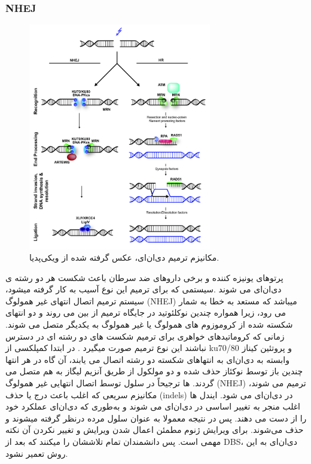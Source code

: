 \documentclass[12pt,a4paper,BCOR=.7cm,headsepline,bibliography=totoc]{report}
\begin{document}
\subsubsection{NHEJ}
\begin{figure}
\centering
\vspace{-65pt}
\includegraphics[width=8cm, ]{pictures/DBSrepair.jpg}
\vspace{-15pt}
\caption{
مکانیزم ترمیم دی‌ان‌ای، عکس گرفته شده از ویکی‌پدیا.
}\label{wrap-fig:4}
\end{figure}
پرتوهای یونیزه کننده و برخی داروهای ضد سرطان باعث شکست هر دو رشته ی دی‌ان‌ای می شوند .سیستمی که برای ترمیم این نوع آسیب به کار گرفته میشود، سیستم ترمیم اتصال انتهای غیر همولوگ (NHEJ) میباشد که مستعد به خطا به شمار می رود، زیرا همواره چندین نوکلئوتید در جایگاه ترمیم از بین می روند و دو انتهای شکسته شده از کروموزوم های همولوگ یا غیر همولوگ به یکدیگر متصل می شوند.
زمانی که کروماتیدهای خواهری برای ترمیم شکست های دو رشته ای در دسترس نباشند این نوع ترمیم صورت میگیرد . در ابتدا کمپلکسی از ku70/80 و پروتئین کیناز وابسته به دی‌ان‌ای به انتهاهای شکسته دو رشته اتصال می یابند، آن گاه در هر انتها چندین باز توسط نوکئاز حذف شده و دو مولکول از طریق آنزیم لیگاز به هم متصل می گردند. 
ها
 ترجیحاً در سلول توسط اتصال انتهایی غیر همولوگ (NHEJ) ترمیم می شوند، مکانیزم سریعی که اغلب باعث درج یا حذف (indels) در دی‌ان‌ای می شود. ایندل ها اغلب منجر به تغییر اساسی در دی‌ان‌ای می شوند و به‌طوری که دی‌ان‌ای عملکرد خود را از دست می دهند. پس در نتیجه معمولا به عنوان سلول مرده درنظر گرفته میشوند و حذف می‌شوند. برای ویرایش ژنوم مطمئن اعمال شدن ویرایش و تغییر نکردن آن نکته مهمی است. پس دانشمندان تمام تلاششان را میکنند که بعد از DBS، دی‌ان‌ای به این روش تعمیر نشود.
\end{document}
